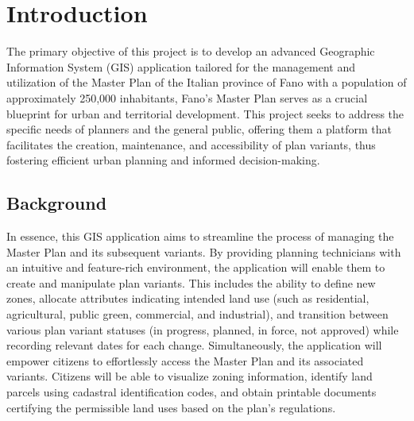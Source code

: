 
\chapter{Introduction}
\label{ch:introduction}
The primary objective of this project is to develop an advanced Geographic Information System (GIS) application tailored for the management and utilization of the Master Plan of the Italian province of Fano with a population of approximately 250,000 inhabitants, Fano's Master Plan serves as a crucial blueprint for urban and territorial development.
This project seeks to address the specific needs of planners and the general public, offering them a platform that facilitates the creation, maintenance, and accessibility of plan variants, thus fostering efficient urban planning and informed decision-making.

\section{Background}\label{sec:background}
In essence, this GIS application aims to streamline the process of managing the Master Plan and its subsequent variants.
By providing planning technicians with an intuitive and feature-rich environment, the application will enable them to create and manipulate plan variants.
This includes the ability to define new zones, allocate attributes indicating intended land use (such as residential, agricultural, public green, commercial, and industrial), and transition between various plan variant statuses (in progress, planned, in force, not approved) while recording relevant dates for each change.
Simultaneously, the application will empower citizens to effortlessly access the Master Plan and its associated variants.
Citizens will be able to visualize zoning information, identify land parcels using cadastral identification codes, and obtain printable documents certifying the permissible land uses based on the plan's regulations.
